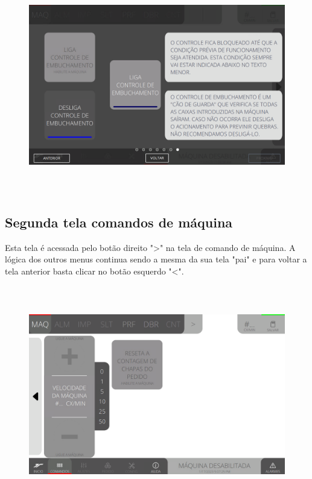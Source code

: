 \begin{figure}[h]
  \centering
  \includegraphics[width=576px,height=360px]{src/imagesFlexo/02-machine/e-7.png}
\end{figure}

\vspace*{\fill}

\newpage
\thispagestyle{fancy}

\vspace*{40 pt}

\subsection{Segunda tela comandos de máquina}\label{telaComandosMaquinaSegundaTelaComandosDeMaquina}

Esta tela é acessada pelo botão direito "\textgreater" na tela de comando de máquina. A lógica dos outros menus continua sendo a mesma da sua tela "pai" e para voltar a tela anterior basta clicar no botão esquerdo "\textless{}".

\vspace*{\fill}

\begin{figure}[h]
  \centering
  \includegraphics[width=576px,height=360px]{src/imagesFlexo/02-machine/e-Tela-Principal-2.png}
\end{figure}

